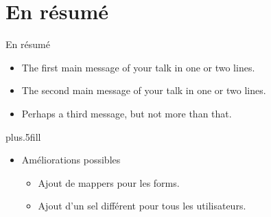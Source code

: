 \section*{En résumé}

\begin{frame}{En résumé}

  \begin{itemize}
  \item
    The \alert{first main message} of your talk in one or two lines.
  \item
    The \alert{second main message} of your talk in one or two lines.
  \item
    Perhaps a \alert{third message}, but not more than that.
  \end{itemize}
  
  \vskip0pt plus.5fill
  \begin{itemize}
  \item
    Améliorations possibles
    \begin{itemize}
    \item
      Ajout de mappers pour les forms.
    \item
      Ajout d'un sel différent pour tous les utilisateurs.
    \end{itemize}
  \end{itemize}
\end{frame}